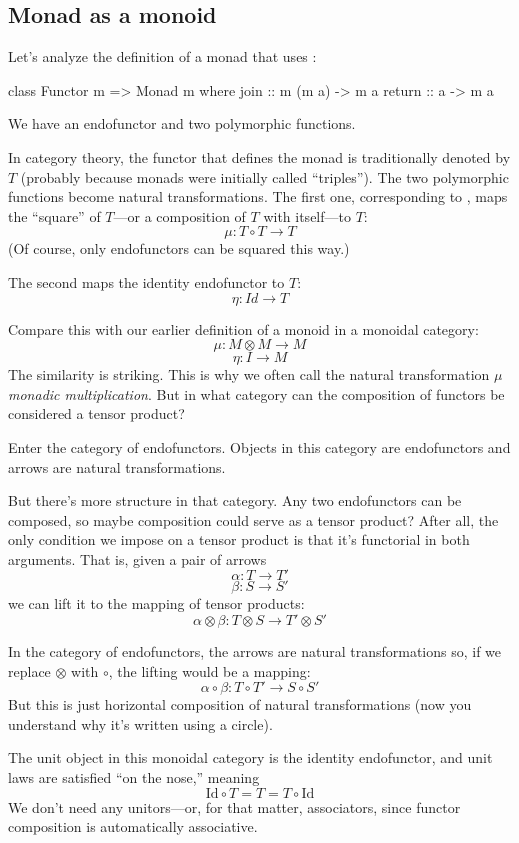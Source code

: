 \documentclass[DaoFP]{subfiles}
\begin{document}
\subsection{Monad as a monoid}

Let's analyze the definition of a monad that uses :
\begin{haskell}
class Functor m => Monad m where
  join :: m (m a) -> m a
  return :: a -> m a
\end{haskell}
We have an endofunctor  and two polymorphic functions. 

In category theory, the functor that defines the monad is traditionally denoted by $T$ (probably because monads were initially called ``triples''). The two polymorphic functions become natural transformations. The first one, corresponding to , maps the ``square'' of $T$---or a composition of $T$ with itself---to $T$:
\[ \mu \colon T \circ T \to T \]
(Of course, only endofunctors can be squared this way.) 

The second maps the identity endofunctor to $T$:
\[ \eta \colon Id \to T \]

Compare this with our earlier definition of a monoid in a monoidal category:
\[ \mu \colon M \otimes M \to M \]
\[ \eta \colon I \to M \]
The similarity is striking. This is why we often call the natural transformation $\mu$ \emph{monadic multiplication}. But in what category can the composition of functors be considered a tensor product? 

Enter the category of endofunctors. Objects in this category are endofunctors and arrows are natural transformations. 

But there's more structure in that category. Any two endofunctors can be composed, so maybe composition could serve as a tensor product? After all, the only condition we impose on a tensor product is that it's functorial in both arguments. That is, given a pair of arrows
 \[ \alpha \colon T \to T'\]
 \[ \beta \colon S \to S' \]
 we can lift it to the mapping of tensor products:
 \[ \alpha \otimes \beta \colon T \otimes S \to T' \otimes S' \]
 
 In the category of endofunctors, the arrows are natural transformations so, if we replace $\otimes$ with $\circ$, the lifting would be a mapping:
\[ \alpha \circ \beta \colon T \circ T' \to S \circ S' \]
But this is just horizontal composition of natural transformations (now you understand why it's written using a circle).

The unit object in this monoidal category is the identity endofunctor, and unit laws are satisfied ``on the nose,'' meaning
\[ \text{Id} \circ T = T = T \circ \text{Id}\]
We don't need any unitors---or, for that matter, associators, since functor composition is automatically associative. 
\end{document}
